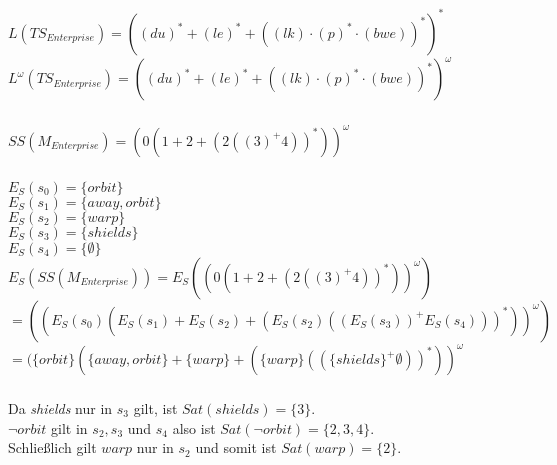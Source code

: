 \documentclass[a4paper,12pt]{scrartcl}
\title{\blatt}
\date{Gruppe 06}
\author{Sabrina Buczko 6663234, Julian Deinert 6535880, Rafael Heid 6704828}
\begin{document}
\maketitle
\newpage
\setcounter{section}{3}
\section{}
\setcounter{subsection}{2}
\subsection{}
\subsubsection{}
$L(TS_{Enterprise})= ((du)^*+(le)^*+((lk)\cdot (p)^*\cdot (bwe))^*)^*$\\
$L^\omega(TS_{Enterprise})=((du)^*+(le)^*+((lk)\cdot (p)^*\cdot (bwe))^*)^\omega$
\subsubsection{}
$SS(M_{Enterprise})=(0(1 + 2 + (2((3)^+ 4))^*))^\omega$\\

\subsubsection{}
$E_S(s_0)=\{orbit\}$\\
$E_S(s_1)=\{away, orbit\}$\\
$E_S(s_2)=\{warp\}$\\
$E_S(s_3)=\{shields\}$\\
$E_S(s_4)=\{\emptyset\}$\\
$E_S(SS(M_{Enterprise}))=E_S((0(1 + 2 + (2((3)^+ 4))^*))^\omega)$\\
$= ((E_S(s_0)(E_S(s_1) + E_S(s_2) + (E_S(s_2)((E_S(s_3))^+ E_S(s_4)))^*))^\omega)$\\
$= (\{orbit\}(\{away,orbit\} + \{warp\} + (\{warp\}((\{shields\}^+ \emptyset))^*))^\omega$\\
\subsubsection{}
Da \textit{shields} nur in $s_3$ gilt, ist $Sat(shields)=\{3\}$.\\
$\neg orbit$ gilt in $s_2, s_3$ und $s_4$ 
also ist $Sat(\neg{orbit})=\{2,3,4\}$.\\
Schließlich gilt $warp$ nur in $s_2$ und somit ist $Sat(warp)=\{2\}$.\\
\end{document}
